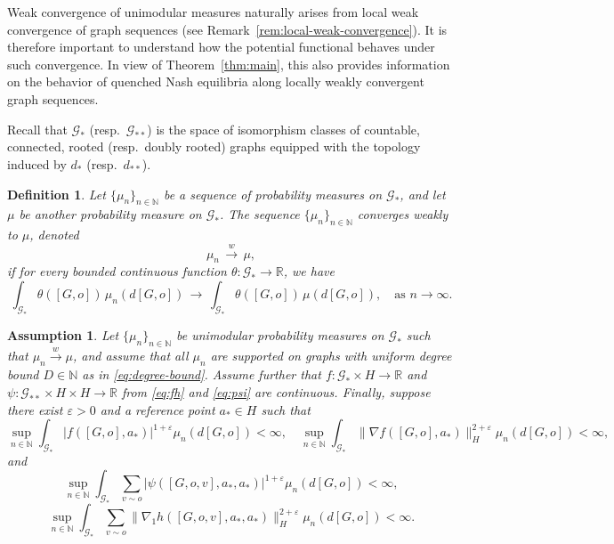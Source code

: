 \documentclass[11pt]{article}
\def\eps{\varepsilon}
\newcommand{\N}{{\mathbb N}}
\newtheorem{definition}[theorem]{Definition}
\newtheorem{assumption}[theorem]{Assumption}
\numberwithin{equation}{section}
\begin{document}
Weak convergence of unimodular measures naturally arises from local weak convergence of graph sequences (see Remark~\ref{rem:local-weak-convergence}). It is therefore important to understand how the potential functional behaves under such convergence. In view of Theorem~\ref{thm:main}, this also provides information on the behavior of quenched Nash equilibria along locally weakly convergent graph sequences. 

Recall that $\mathcal{G}_\ast$ (resp.~$\mathcal{G}_{\ast\ast}$) is the space of isomorphism classes of countable, connected, rooted (resp.~doubly rooted) graphs equipped with the topology induced by $d_\ast$ (resp.~$d_{\ast\ast}$).

\begin{definition} 
Let $\{\mu_n\}_{n\in\N}$ be a sequence of probability measures on $\mathcal{G}_*$, and let $\mu$ be another probability measure on $\mathcal{G}_*$. The sequence $\{\mu_n\}_{n\in\N}$ converges weakly to $\mu$, denoted
\[
\mu_n \,\xrightarrow{w}\, \mu,
\]
if for every bounded continuous function $\theta:\mathcal{G}_* \to \mathbb{R}$, we have
\[
\int_{\mathcal{G}_*} \theta([G,o]) \, \mu_n(d[G,o]) \,\longrightarrow\, \int_{\mathcal{G}_*} \theta([G,o]) \, \mu(d[G,o]), \quad \text{as } n \to \infty.
\]
\end{definition}

\begin{assumption}\label{ass:thermo}
Let \(\{\mu_n\}_{n\in\N}\) be unimodular probability measures on \(\mathcal G_\ast\) such that \(\mu_n\xrightarrow{w}\mu\), and assume that all \(\mu_n\) are supported on graphs with uniform degree bound \(D\in\mathbb N\) as in \eqref{eq:degree-bound}. Assume further that \(f:\mathcal G_\ast\times H\to\mathbb R\) and \(\psi:\mathcal G_{\ast\ast}\times H\times H\to\mathbb R\) from \eqref{eq:fh} and \eqref{eq:psi} are continuous. Finally, suppose there exist \(\eps>0\) and a reference point $a_\ast\in H$ such that
\begin{equation}\label{eq:thermo-base-f}
\sup_{n\in\N}\int_{\mathcal G_\ast}|f([G,o],a_\ast)|^{1+\eps}\mu_n(d[G,o])<\infty,
\quad
\sup_{n\in\N}\int_{\mathcal G_\ast}\|\nabla f([G,o],a_\ast)\|_H^{2+\eps}\mu_n(d[G,o])<\infty,
\end{equation}
and
\begin{equation}\label{eq:thermo-base-psi}
\sup_{n\in\N}\int_{\mathcal G_\ast}\sum_{v\sim o}|\psi([G,o,v],a_\ast,a_\ast)|^{1+\eps}\mu_n(d[G,o])<\infty,
\end{equation}
\begin{equation}\label{eq:thermo-base-h}
\sup_{n\in\N}\int_{\mathcal G_\ast}\sum_{v\sim o}\|\nabla_1 h([G,o,v],a_\ast,a_\ast)\|_H^{2+\eps}\mu_n(d[G,o])<\infty.
\end{equation}
\end{assumption}
\end{document}
